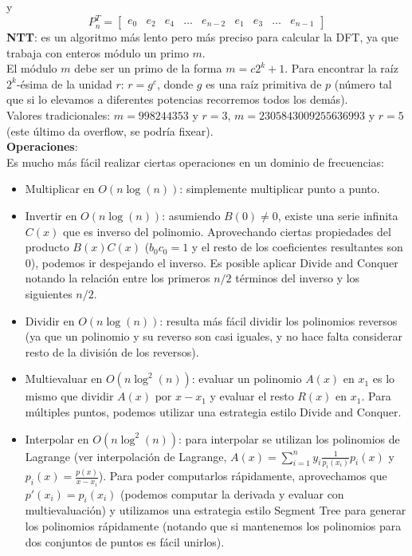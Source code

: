 {\[\]
    y
\[
    P_n^T = 
    \begin{bmatrix}
        e_0 & e_2 & e_4 & \ldots & e_{n-2} & e_1 & e_3 & \ldots & e_{n-1}
    \end{bmatrix}
\]  
\textbf{NTT}: es un algoritmo más lento pero más preciso para calcular la DFT,
ya que trabaja con enteros módulo un primo $m$. \\
El módulo $m$ debe ser un primo de la forma $m = c2^k + 1$.
Para encontrar la raíz $2^k$-ésima de la unidad $r$: $r = g ^ c$, donde $g$ es una raíz primitiva de $p$ (número tal que si lo elevamos a diferentes potencias recorremos todos los demás). \\
Valores tradicionales: $m = 998244353$ y $r = 3$, $m = 2305843009255636993$ y $r = 5$ (este último da overflow, se podría fixear). \\

\textbf{Operaciones}: \\
Es mucho más fácil realizar ciertas operaciones en un dominio de frecuencias:
\begin{itemize}
	\item Multiplicar en $O(n\log(n))$: simplemente multiplicar punto a punto.

    \item Invertir en $O(n\log(n))$: asumiendo $B(0) \neq 0$, existe una serie infinita $C(x)$ que es inverso del polinomio.
    Aprovechando ciertas propiedades del producto $B(x)C(x)$ ($b_0c_0 = 1$ y el resto de los coeficientes resultantes son $0$),
    podemos ir despejando el inverso. Es posible aplicar Divide and Conquer notando la relación entre los primeros $n/2$ términos
    del inverso y los siguientes $n/2$.

	\item Dividir en $O(n\log(n))$: resulta más fácil dividir los polinomios reversos (ya que un polinomio y su reverso son casi iguales,
	y no hace falta considerar resto de la división de los reversos).
	
    \item Multievaluar en $O(n\log^2(n))$: evaluar un polinomio $A(x)$ en $x_1$ es lo mismo que dividir $A(x)$ por $x - x_1$ y evaluar el resto
    $R(x)$ en $x_1$. Para múltiples puntos, podemos utilizar una estrategia estilo Divide and Conquer.

    \item Interpolar en $O(n\log^2(n))$: para interpolar se utilizan los polinomios de Lagrange (ver interpolación de Lagrange, 
    $A(x)=\sum_{i=1}^{n} y_i\frac{1}{p_i(x_i)}p_i(x)$ y $p_i(x) = \frac{p(x)}{x-x_i}$). Para poder computarlos rápidamente, aprovechamos que
    $p'(x_i)=p_i(x_i)$ (podemos computar la derivada y evaluar con multievaluación) y utilizamos una estrategia estilo Segment Tree para
    generar los polinomios rápidamente (notando que si mantenemos los polinomios para dos conjuntos de puntos es fácil unirlos).


\end{itemize}}

